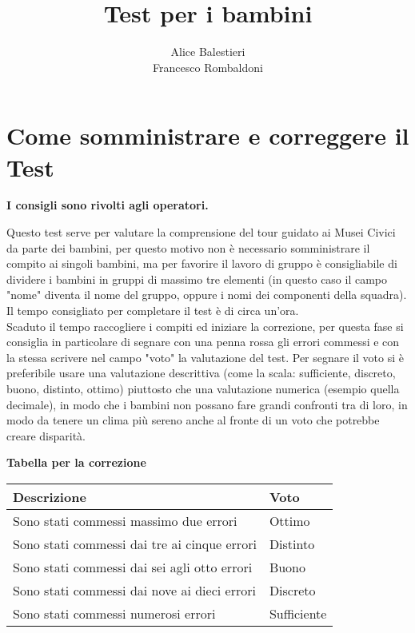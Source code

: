 \documentclass[hidelinks,12pt,a4paper]{exam}
\begin{document}
	\title{\textbf{Test per i bambini}}
	\author{Alice Balestieri\\Francesco Rombaldoni}
	\date{}
	\maketitle
	
	\newpage
	
	\tableofcontents
	\newpage
	
	\section{Come somministrare e correggere il Test}
	\begin{center}
		\textbf{I consigli sono rivolti agli operatori.}
	\end{center}
	
	Questo test serve per valutare la comprensione del tour guidato ai Musei Civici da parte dei bambini, per questo motivo non è necessario somministrare il compito ai singoli bambini, ma per favorire il lavoro di gruppo è consigliabile di dividere i bambini in gruppi di massimo tre elementi (in questo caso il campo "nome" diventa il nome del gruppo, oppure i nomi dei componenti della squadra). Il tempo consigliato per completare il test è di circa un'ora.\\
	Scaduto il tempo raccogliere i compiti ed iniziare la correzione, per questa fase si consiglia in particolare di segnare con una penna rossa gli errori commessi e con la stessa scrivere nel campo "voto" la valutazione del test. Per segnare il voto si è preferibile usare una valutazione descrittiva (come la scala: sufficiente, discreto, buono, distinto, ottimo) piuttosto che una valutazione numerica (esempio quella decimale), in modo che i bambini non possano fare grandi confronti tra di loro, in modo da tenere un clima più sereno anche al fronte di un voto che potrebbe creare disparità.\\
	
	\begin{center}
		\large{\textbf{Tabella per la correzione}}\\
		\bigskip
		
		\begin{tabularx}{0.5\textwidth} { 
				| >{\raggedright\arraybackslash}X 
				| >{\centering\arraybackslash}X | }
			\hline
			\textbf{Descrizione} & \textbf{Voto} \\
			\hline
			Sono stati commessi massimo due errori & Ottimo\\
			\hline
			Sono stati commessi dai tre ai cinque errori & Distinto\\
			\hline
			Sono stati commessi dai sei agli otto errori & Buono\\
			\hline
			Sono stati commessi dai nove ai dieci errori & Discreto\\
			\hline
			Sono stati commessi numerosi errori & Sufficiente\\
			\hline
			\end{tabularx}
	\end{center}
	
\end{document}
